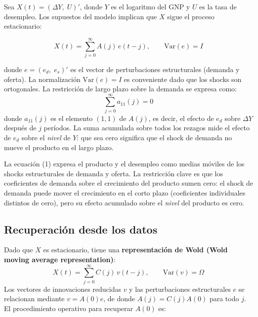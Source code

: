\documentclass[12pt]{article}
\begin{document}
Sea $X(t) = (\Delta Y,\; U)'$, donde $Y$ es el logaritmo del GNP y $U$ es la tasa de desempleo. Los supuestos del modelo implican que $X$ sigue el proceso estacionario:

\begin{equation}
  X(t) = \sum_{j=0}^{\infty} A(j)\, e(t-j), \qquad \mathrm{Var}(e) = I
\end{equation}

donde $e = (e_d,\; e_s)'$ es el vector de perturbaciones estructurales (demanda y oferta). La normalizaci\'on $\mathrm{Var}(e) = I$ es conveniente dado que los shocks son ortogonales. La restricci\'on de largo plazo sobre la demanda se expresa como:
\[
  \sum_{j=0}^{\infty} a_{11}(j) = 0
\]
donde $a_{11}(j)$ es el elemento $(1,1)$ de $A(j)$, es decir, el efecto de $e_d$ sobre $\Delta Y$ despu\'es de $j$ per\'iodos. La suma acumulada sobre todos los rezagos mide el efecto de $e_d$ sobre el \emph{nivel} de $Y$: que sea cero significa que el shock de demanda no mueve el producto en el largo plazo.

\begin{intuicion}
La ecuaci\'on (1) expresa el producto y el desempleo como medias m\'oviles de los shocks estructurales de demanda y oferta. La restricci\'on clave es que los coeficientes de demanda sobre el crecimiento del producto sumen cero: el shock de demanda puede mover el crecimiento en el corto plazo (coeficientes individuales distintos de cero), pero su efecto acumulado sobre el \emph{nivel} del producto es cero.
\end{intuicion}

\subsection{Recuperaci\'on desde los datos}

Dado que $X$ es estacionario, tiene una \textbf{representaci\'on de Wold (Wold moving average representation)}:
\[
  X(t) = \sum_{j=0}^{\infty} C(j)\, v(t-j), \qquad \mathrm{Var}(v) = \Omega
\]
Los vectores de innovaciones reducidas $v$ y las perturbaciones estructurales $e$ se relacionan mediante $v = A(0)e$, de donde $A(j) = C(j)A(0)$ para todo $j$. El procedimiento operativo para recuperar $A(0)$ es:
\end{document}
